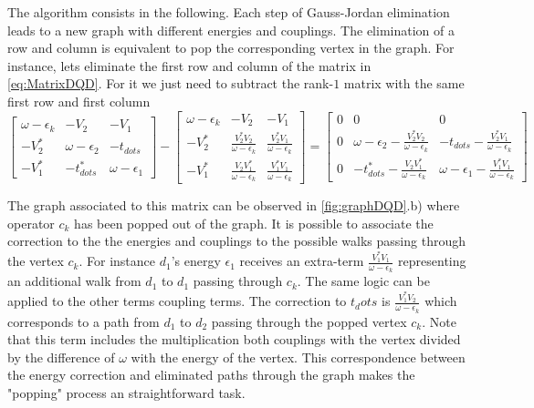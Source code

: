 The algorithm consists in the following. Each step of Gauss-Jordan elimination leads to a new graph with different energies and couplings. The elimination of a row and column is equivalent to pop the corresponding vertex in the graph. For instance, lets eliminate the first row and column of the matrix in \eqref{eq:MatrixDQD}. For it we just need to subtract the rank-$1$ matrix with the same first row and first column
\begin{equation}
        \left[\begin{array}{ccc}
    \omega-\epsilon_{k} & -V_{2} & -V_{1}\\
    -V_{2}^{*} & \omega-\epsilon_{2} & -t_{dots}\\
    -V_{1}^{*} & -t_{dots}^{*} & \omega-\epsilon_{1}
    \end{array}\right]-\left[\begin{array}{ccc}
    \omega-\epsilon_{k} & -V_{2} & -V_{1}\\
    -V_{2}^{*} & \frac{V_{2}^{*}V_{2}}{\omega-\epsilon_{k}} & \frac{V_{2}^{*}V_{1}}{\omega-\epsilon_{k}}\\
    -V_{1}^{*} & \frac{V_{2}V_{1}^{*}}{\omega-\epsilon_{k}} & \frac{V_{1}^{*}V_{1}}{\omega-\epsilon_{k}}
    \end{array}\right]=\left[\begin{array}{ccc}
    0 & 0 & 0\\
    0 & \omega-\epsilon_{2}-\frac{V_{2}^{*}V_{2}}{\omega-\epsilon_{k}} & -t_{dots}-\frac{V_{2}^{*}V_{1}}{\omega-\epsilon_{k}}\\
    0 & -t_{dots}^{*}-\frac{V_{2}V_{1}^{*}}{\omega-\epsilon_{k}} & \omega-\epsilon_{1}-\frac{V_{1}^{*}V_{1}}{\omega-\epsilon_{k}}
    \end{array}\right]
    \label{eq:Gauss-Jordan} 
\end{equation}

The graph associated to this matrix can be observed in \ref{fig:graphDQD}.b) where operator $c_k$ has been popped out of the graph. It is possible to associate the correction to the the energies and couplings to the possible walks passing through the vertex $c_k$.  For instance $d_1$'s energy $\epsilon_1$ receives an extra-term $\frac{V_{1}^{*}V_{1}}{\omega-\epsilon_{k}}$ representing an additional walk  from $d_1$ to $d_1$ passing through  $c_k$. The same logic can be applied to the other terms coupling terms. The correction to $t_dots$ is $\frac{V_{1}^{*}V_{2}}{\omega-\epsilon_{k}}$ which corresponds to a path from $d_1$ to $d_2$ passing through the popped vertex $c_k$. Note that this term includes the multiplication both couplings with the vertex divided by the difference of $\omega$ with the energy of the vertex. This correspondence between the energy correction and eliminated paths through the graph makes the "popping" process an straightforward task. 

